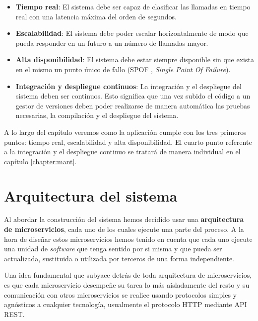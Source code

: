 \begin{itemize}
	\item \textbf{Tiempo real}: El sistema debe ser capaz de clasificar las llamadas en tiempo real con una latencia máxima del orden de segundos. 
	\item \textbf{Escalabilidad}: El sistema debe poder escalar horizontalmente de modo que pueda responder en un futuro a un número de llamadas mayor. 
	\item \textbf{Alta disponibilidad}: El sistema debe estar siempre disponible sin que exista en el mismo un punto único de fallo (SPOF , \textit{Single Point Of Failure}).
	\item \textbf{Integración y despliegue continuos}: La integración y el despliegue del sistema deben ser continuos. Esto significa que una vez subido el código a un gestor de versiones deben poder realizarse de manera automática las pruebas necesarias, la compilación y el despliegue del sistema.
	
\end{itemize}

A lo largo del capítulo veremos como la aplicación cumple con los tres primeros puntos: tiempo real, escalabilidad y alta disponibilidad. El cuarto punto referente a la integración y el despliegue continuo se tratará de manera individual en el capítulo \ref{chapter:mant}.

\section{Arquitectura del sistema}


Al abordar la construcción del sistema hemos decidido usar una \textbf{arquitectura de microservicios}, cada uno de los cuales ejecute una parte del proceso. A la hora de diseñar estos microservicios hemos tenido en cuenta que cada uno ejecute una unidad de \textit{software} que tenga sentido por si misma y que pueda ser actualizada, sustituida o utilizada por terceros de una forma independiente. 

Una idea fundamental que subyace detrás de toda arquitectura de microservicios, es que cada microservicio desempeñe su tarea lo más aisladamente del resto y su comunicación con otros microservicios se realice usando protocolos simples y agnósticos a cualquier tecnología, usualmente el protocolo HTTP mediante API REST. 

